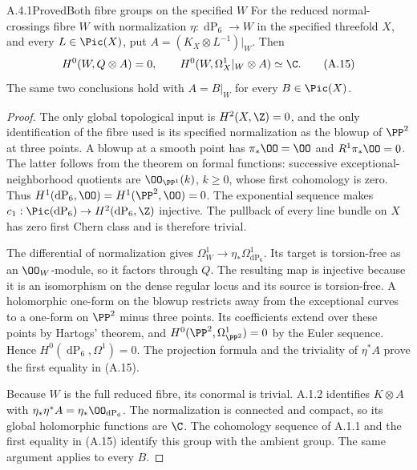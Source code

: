 \begin{statement}{A.4.1}{Proved}{Both fibre groups on the specified $W$}
For the reduced normal-crossings fibre $W$ with normalization $\eta:\operatorname{dP}_6\to W$ in the specified threefold $X$, and every $L\in\Pic(X)$, put $A=(K_X\otimes L^{-1})|_W$. Then
\[
H^0(W,Q\otimes A)=0,
\qquad H^0(W,\Omega_X^1|_W\otimes A)\simeq\C.
\tag{A.15}
\]
The same two conclusions hold with $A=B|_W$ for every $B\in\Pic(X)$.
\end{statement}
\begin{proof}
The only global topological input is $H^2(X,\Z)=0$, and the only identification of the fibre used is its specified normalization as the blowup of $\PP^2$ at three points. A blowup at a smooth point has $\pi_*\OO=\OO$ and $R^1\pi_*\OO=0$. The latter follows from the theorem on formal functions: successive exceptional-neighborhood quotients are $\OO_{\PP^1}(k)$, $k\ge0$, whose first cohomology is zero. Thus $H^1(\operatorname{dP}_6,\OO)=H^1(\PP^2,\OO)=0$. The exponential sequence makes $c_1:\Pic(\operatorname{dP}_6)\to H^2(\operatorname{dP}_6,\Z)$ injective. The pullback of every line bundle on $X$ has zero first Chern class and is therefore trivial.

The differential of normalization gives $\Omega_W^1\to\eta_*\Omega^1_{\operatorname{dP}_6}$. Its target is torsion-free as an $\OO_W$-module, so it factors through $Q$. The resulting map is injective because it is an isomorphism on the dense regular locus and its source is torsion-free. A holomorphic one-form on the blowup restricts away from the exceptional curves to a one-form on $\PP^2$ minus three points. Its coefficients extend over these points by Hartogs' theorem, and $H^0(\PP^2,\Omega^1_{\PP^2})=0$ by the Euler sequence. Hence $H^0(\operatorname{dP}_6,\Omega^1)=0$. The projection formula and the triviality of $\eta^*A$ prove the first equality in (A.15).

Because $W$ is the full reduced fibre, its conormal is trivial. A.1.2 identifies $K\otimes A$ with $\eta_*\eta^*A=\eta_*\OO_{\operatorname{dP}_6}$. The normalization is connected and compact, so its global holomorphic functions are $\C$. The cohomology sequence of A.1.1 and the first equality in (A.15) identify this group with the ambient group. The same argument applies to every $B$.
\end{proof}

